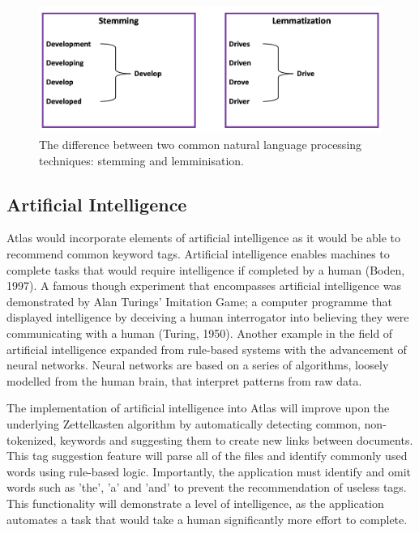 \documentclass{article}
\begin{document}
\begin{figure}[!htb]
  \centering
      \includegraphics[width=1\textwidth]{images/litreview-nlp.png}
  \caption{The difference between two common natural language processing techniques: stemming and lemminisation.}
  \label{fig:stemlem}
\end{figure}

\subsection{Artificial Intelligence}

Atlas would incorporate elements of artificial intelligence as it would be able to recommend common keyword tags. Artificial intelligence enables machines to complete tasks that would require intelligence if completed by a human (Boden, 1997). A famous though experiment that encompasses artificial intelligence was demonstrated by Alan Turings' Imitation Game; a computer programme that displayed intelligence by deceiving a human interrogator into believing they were communicating with a human (Turing, 1950). Another example in the field of artificial intelligence expanded from rule-based systems with the advancement of neural networks. Neural networks are based on a series of algorithms, loosely modelled from the human brain, that interpret patterns from raw data.

The implementation of artificial intelligence into Atlas will improve upon the underlying Zettelkasten algorithm by automatically detecting common, non-tokenized, keywords and suggesting them to create new links between documents. This tag suggestion feature will parse all of the files and identify commonly used words using rule-based logic. Importantly, the application must identify and omit words such as 'the', 'a' and 'and' to prevent the recommendation of useless tags. This functionality will demonstrate a level of intelligence, as the application automates a task that would take a human significantly more effort  to complete.
\end{document}
